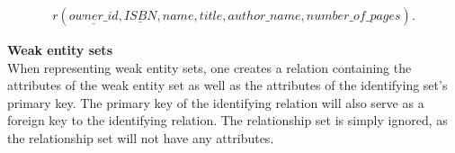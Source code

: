 \begin{equation}\label{eq:TotalOneToOne}
    \begin{split}
        r(\underline{owner\_id},\underline{ISBN}, name, title, author\_name, number\_of\_pages).
    \end{split}
\end{equation}


\textbf{Weak entity sets}\\
When representing weak entity sets, one creates a relation containing the attributes of the weak entity set as well as the attributes of the identifying set's primary key.
The primary key of the identifying relation will also serve as a foreign key to the identifying relation\cite{DBSBook}.
The relationship set is simply ignored, as the relationship set will not have any attributes\cite{DBSBook}. 

